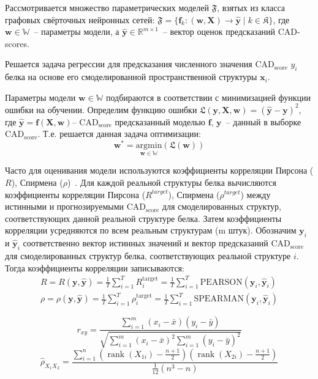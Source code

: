 \documentclass[14pt]{extarticle}
\begin{document}
Рассмотривается множество параметрических моделей $\mathfrak{F}$, взятых из класса графовых свёрточных нейронных сетей: $\mathfrak{F} = \{\mathbf{f}_k\colon(\mathbf{w}, \mathbf{X})\to  \mathbf{\hat{y}}\mid k \in \mathfrak{K}\}$, где $\mathbf{w} \in \mathbb{W}$~-- параметры модели, а $\hat{\mathbf{y}}\in \mathbb{R}^{m\times 1}$~-- вектор оценок предсказаний CAD-scores. 

Решается задача регрессии для предсказания численного значения $\text{CAD}_\text{score}$ $y_i$ белка на основе его смоделированной пространственной структуры $\mathbf{x}_i$.

Параметры модели $\mathbf{w}\in \mathbb{W}$ подбираются в соответствии с минимизацией функции ошибки на обучении. Определим функцию ошибки
$\mathfrak{L}(\mathbf{y}, \mathbf{X}, \mathbf{w}) =\left( \mathbf{\hat{y}} - \mathbf{y} \right)^{2}$, где $\mathbf{\hat{y}} = \mathbf{f} (\mathbf{X},\mathbf{w})$-- $\text{CAD}_\text{score}$ предсказанный моделью $\mathbf{f}$, $\mathbf{y}$~-- данный в выборке $\text{CAD}_\text{score}$.
Т.е. решается данная задача оптимизации: 
$$\textbf{w}^* = \underset{\mathbf{w}\in\mathbb{W}}{\text{argmin}}(\mathfrak{L}(\textbf{w}))$$

Часто для оценивания модели используются коэффициенты корреляции Пирсона ($R$), Спирмена ($\rho$)~\cite{3DCNN, Baldassarre2019GraphQAPM, 10.1093/bioinformatics/btz122}. Для каждой реальной структуры белка вычисляются коэффициенты корреляции Пирсона ($R^{target}$), Спирмена ($\rho^{target}$) между истинными и прогнозируемыми $\text{CAD}_\text{score}$ для смоделированных структур, соответствующих данной реальной структуре белка. Затем коэффициенты корреляции усредняются по всем реальным структурам (m штук). Обозначим $\mathbf{y}_i$ и $\mathbf{\hat{y}}_i$ соответственно вектор истинных значений и вектор предсказаний $\text{CAD}_\text{score}$ для смоделированных структур белка, соответствующих реальной структуре $i$. Тогда коэффициенты корреляции записываются:
$$\begin{aligned}
R = R\left(\mathbf{y}, \hat{\mathbf{y}}\right) = \frac{1}{T} \sum_{i=1}^{T} R^\text{target}_i=\frac{1}{T} \sum_{i=1}^{T} \text{PEARSON} \left(\mathbf{y}_i,\hat{\mathbf{y}}_i\right) \\ 
\rho= \rho\left(\mathbf{y}, \hat{\mathbf{y}}\right) = \frac{1}{T} \sum_{i=1}^{T} \rho^\text{target}_i = \frac{1}{T} \sum_{i=1}^{T} \text{SPEARMAN} \left(\mathbf{y}_i,\hat{\mathbf{y}}_i\right)
\end{aligned}$$

$$r_{x y}=\frac{\sum_{i=1}^{m}\left(x_{i}-\bar{x}\right)\left(y_{i}-\bar{y}\right)}{\sqrt{\sum_{i=1}^{m}\left(x_{i}-\bar{x}\right)^{2} \sum_{i=1}^{m}\left(y_{i}-\bar{y}\right)^{2}}}$$
$$\hat{\rho}_{X_{1} X_{2}}=\frac{\sum_{i=1}^{n}\left(\operatorname{rank}\left(X_{1 i}\right)-\frac{n+1}{2}\right)\left(\operatorname{rank}\left(X_{2 i}\right)-\frac{n+1}{2}\right)}{\frac{1}{12}\left(n^{3}-n\right)}$$
\end{document}
